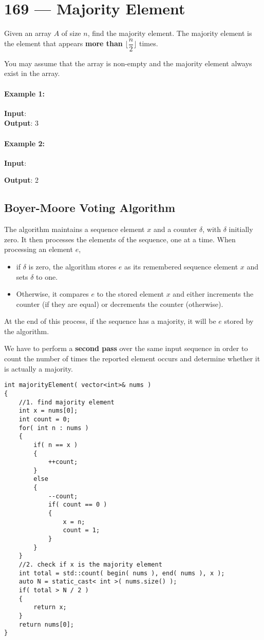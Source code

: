 \section{169 --- Majority Element}
Given an array $A$ of size $n$, find the majority element. The majority element is the element that appears \textbf{more than} $\lfloor \dfrac{n}{2}\rfloor$ times.

You may assume that the array is non-empty and the majority element always exist in the array.
\paragraph{Example 1:}
\begin{flushleft}
\textbf{Input}: \fcj{[3,2,3]}
\\
\textbf{Output}: 3
\end{flushleft}
\paragraph{Example 2:}
\begin{flushleft}
\textbf{Input}: \fcj{[2,2,1,1,1,2,2]}

\textbf{Output}: 2
\end{flushleft}
\subsection{Boyer-Moore Voting Algorithm}
The algorithm maintains a sequence element $x$ and a counter $\delta$, with $\delta$ initially zero. It then processes the elements of the sequence, one at a time. When processing an element $e$, 
\begin{itemize}
\item if $\delta$ is zero, the algorithm stores $e$ as its remembered sequence element $x$ and sets $\delta$ to one. 
\item Otherwise, it compares $e$ to the stored element $x$ and either increments the counter (if they are equal) or decrements the counter (otherwise).
\end{itemize}
At the end of this process, if the sequence has a majority, it will be $e$ stored by the algorithm.

We have to perform a \textbf{second pass} over the same input sequence in order to count the number of times the reported element occurs and determine whether it is actually a majority.

\setcounter{lstlisting}{0}
\begin{lstlisting}[style=customc, caption={Boyer-Moore Voting Algorithm}]
int majorityElement( vector<int>& nums )
{
    //1. find majority element
    int x = nums[0];
    int count = 0;
    for( int n : nums )
    {
        if( n == x )
        {
            ++count;
        }
        else
        {
            --count;
            if( count == 0 )
            {
                x = n;
                count = 1;
            }
        }
    }
    //2. check if x is the majority element
    int total = std::count( begin( nums ), end( nums ), x );
    auto N = static_cast< int >( nums.size() );
    if( total > N / 2 )
    {
        return x;
    }
    return nums[0];
}
\end{lstlisting}
